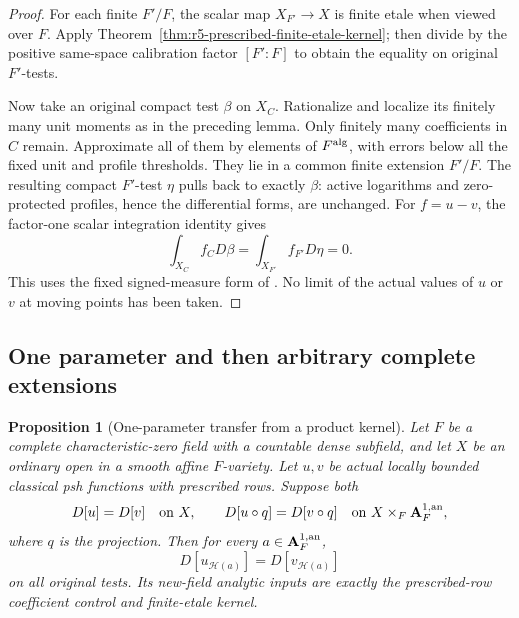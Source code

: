 \documentclass[11pt,a4paper]{article}
\numberwithin{equation}{section}
\newtheorem{proposition}[theorem]{Proposition}
\theoremstyle{definition}
\theoremstyle{remark}
\begin{document}
\begin{proof}
For each finite $F'/F$, the scalar map $X_{F'}\to X$ is finite
etale when viewed over $F$.  Apply
Theorem~\ref{thm:r5-prescribed-finite-etale-kernel}; then divide by
the positive same-space calibration factor $[F':F]$ to obtain the
equality on original $F'$-tests.

Now take an original compact test $\beta$ on $X_C$.  Rationalize
and localize its finitely many unit moments as in the preceding
lemma.  Only finitely many coefficients in $C$ remain.  Approximate
all of them by elements of $F^{\rm alg}$, with errors below all
the fixed unit and profile thresholds.  They lie in a common finite
extension $F'/F$.  The resulting compact $F'$-test $\eta$ pulls
back to exactly $\beta$: active logarithms and zero-protected
profiles, hence the differential forms, are unchanged.  For
$f=u-v$, the factor-one scalar integration identity gives
\[
 \int_{X_C}f_C D\beta=\int_{X_{F'}}f_{F'}D\eta=0.
\]
This uses the fixed signed-measure form of
\cite[Proposition 15.3.1, p.~425]{CLD25}.  No limit of the actual
values of $u$ or $v$ at moving points has been taken.
\end{proof}

\subsection{One parameter and then arbitrary complete extensions}

\begin{proposition}[One-parameter transfer from a product kernel]
\label{prop:r5-one-parameter-kernel}
Let $F$ be a complete characteristic-zero field with a countable
dense subfield, and let $X$ be an ordinary open in a smooth affine
$F$-variety.  Let $u,v$ be actual locally bounded classical psh
functions with prescribed rows.  Suppose both
\[
 D[u]=D[v]\quad\hbox{on }X,
 \qquad
 D[u\circ q]=D[v\circ q]\quad\hbox{on }X\times_F\mathbf A_F^{1,\rm an},
\]
where $q$ is the projection.  Then for every
$a\in\mathbf A_F^{1,\rm an}$,
\[
 D[u_{\mathscr H(a)}]=D[v_{\mathscr H(a)}]
\]
on all original tests.  Its new-field analytic inputs are exactly
the prescribed-row coefficient control and finite-etale kernel.
\end{proposition}
\end{document}
